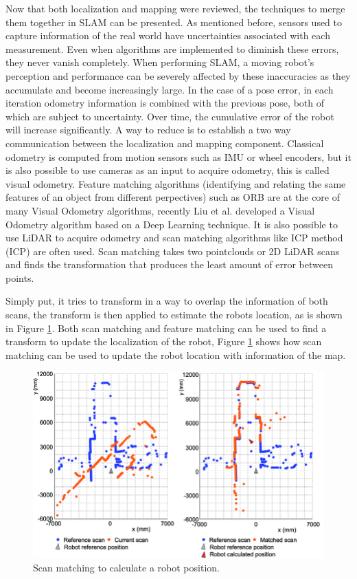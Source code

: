 Now that both localization and mapping were reviewed, the techniques to merge them together in \acs*{SLAM} can be presented. As mentioned before, sensors used to capture information of the real world have uncertainties associated with each measurement. Even when algorithms are implemented to diminish these errors, they never vanish completely. When performing \acs*{SLAM}, a moving robot's perception and performance can be severely affected by these inaccuracies as they accumulate and become increasingly large. In the case of a pose error, in each iteration odometry information is combined with the previous pose, both of which are subject to uncertainty. Over time, the cumulative error of the robot will increase significantly. A way to reduce is to establish a two way communication between the localization and mapping component. Classical odometry is computed from motion sensors such as \acs*{IMU} or wheel encoders, but it is also possible to use cameras as an input to acquire odometry, this is called visual odometry. Feature matching algorithms (identifying and relating the same features of an object from different perpectives) such as ORB \cite{rublee_orb_2011} are at the core of many Visual Odometry algorithms, recently Liu et al. \cite{liu_visual_2021} developed a Visual Odometry algorithm based on a Deep Learning technique.
It is also possible to use \acs*{LiDAR} to acquire odometry and scan matching algorithms like \acl*{ICP} method (\acs*{ICP}) are often used. Scan matching takes two pointclouds or 2D \acs*{LiDAR} scans and finds the transformation that produces the least amount of error between points.

Simply put, it tries to transform in a way to overlap the information of both scans, the transform is then applied to estimate the robots location, as is shown in Figure \ref*{fig: scan mathing algorithm}. Both scan matching and feature matching can be used to find a transform to update the localization of the robot, Figure \ref*{fig: scan mathing algorithm} shows how scan matching can be used to update the robot location with information of the map.

\begin{figure}[H]
    \centering
    \includegraphics[width=0.7\linewidth]{images/background/Scan-matching-problem-definition-a-Scans-before-alignment-b-Scans-after-alignment.png}
    \caption{Scan matching to calculate a robot position. \cite{konecny_scan_2019}}
    \label{fig: scan mathing algorithm}
\end{figure}

